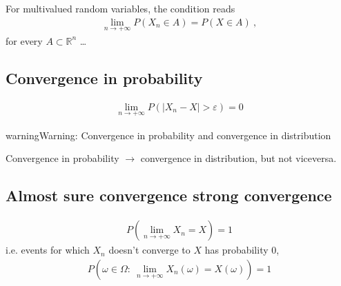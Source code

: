 \documentclass[letterpaper,10pt,english]{jupyterBook}
\begin{document}
\sphinxAtStartPar
For multi\sphinxhyphen{}valued random variables, the condition reads
\begin{equation*}
\begin{split}\lim_{n \rightarrow +\infty} P( X_n \in A) = P( X \in A) \ ,\end{split}
\end{equation*}
\sphinxAtStartPar
for every \(A \subset \mathbb{R}^n\) …


\subsection{Convergence in probability}
\label{\detokenize{ch/prob/convergence:convergence-in-probability}}\label{\detokenize{ch/prob/convergence:prob-convergence-probability}}\begin{equation*}
\begin{split}\lim_{n \rightarrow + \infty} P \left(\left| X_n - X \right| > \varepsilon  \right) = 0\end{split}
\end{equation*}
\begin{sphinxadmonition}{warning}{Warning:}
\sphinxAtStartPar
Convergence in probability and convergence in distribution

\sphinxAtStartPar
Convergence in probability \( \rightarrow \) convergence in distribution, but not viceversa.

\sphinxAtStartPar
{}
\end{sphinxadmonition}


\subsection{Almost sure convergence \sphinxhyphen{} strong convergence}
\label{\detokenize{ch/prob/convergence:almost-sure-convergence-strong-convergence}}\label{\detokenize{ch/prob/convergence:prob-convergence-strong}}\begin{equation*}
\begin{split}P\left( \lim_{n \rightarrow +\infty} X_n = X \right) = 1\end{split}
\end{equation*}
\sphinxAtStartPar
i.e. events for which \(X_n\) doesn’t converge to \(X\) has probability \(0\),
\begin{equation*}
\begin{split}P\left( \omega \in \Omega: \ \lim_{n \rightarrow + \infty} X_n(\omega) = X(\omega) \right) = 1\end{split}
\end{equation*}
\end{document}
